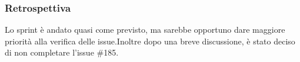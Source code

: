 \subsubsection{Retrospettiva}
Lo sprint è andato quasi come previsto, ma sarebbe opportuno dare maggiore priorità alla verifica delle issue.Inoltre dopo una breve discussione, è stato deciso di non completare l'issue \#185.
